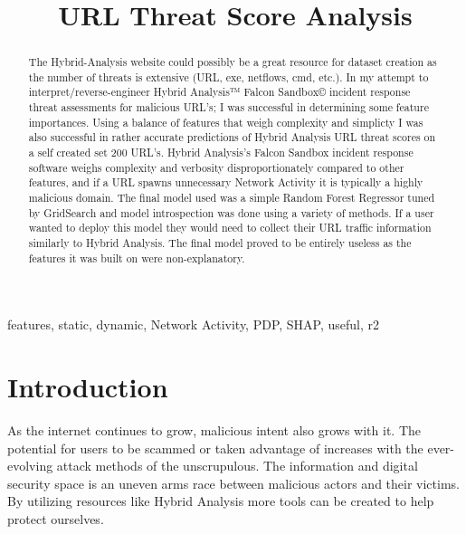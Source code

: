 \documentclass[conference]{IEEEtran}
\begin{document}
\title{URL Threat Score Analysis\\
}

\author{
}

\maketitle

\begin{abstract}
The Hybrid-Analysis website could possibly be a great resource for dataset creation as the number of threats is extensive (URL, exe, netflows, cmd, etc.). In my attempt to interpret/reverse-engineer Hybrid Analysis™ Falcon Sandbox© incident response threat assessments for malicious URL's; I was successful in determining some feature importances. Using a balance of features that weigh complexity and simplicty I was also successful in rather accurate predictions of Hybrid Analysis URL threat scores on a self created set 200 URL's. Hybrid Analysis's Falcon Sandbox incident response software weighs complexity and verbosity disproportionately compared to other features, and if a URL spawns unnecessary Network Activity it is typically a highly malicious domain. The final model used was a simple Random Forest Regressor tuned by GridSearch and model introspection was done using a variety of methods. If a user wanted to deploy this model they would need to collect their URL traffic information similarly to Hybrid Analysis. The final model proved to be entirely useless as the features it was built on were non-explanatory.
\end{abstract}

\begin{IEEEkeywords}
features, static, dynamic, Network Activity, PDP, SHAP, useful, r2
\end{IEEEkeywords}

\section{Introduction}
As the internet continues to grow, malicious intent also grows with it. The potential for users to be scammed or taken advantage of increases with the ever-evolving attack methods of the unscrupulous. The information and digital security space is an uneven arms race between malicious actors and their victims. By utilizing resources like Hybrid Analysis more tools can be created to help protect ourselves.
\end{document}
